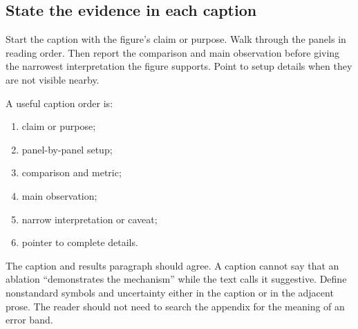 \subsection{State the evidence in each caption}

Start the caption with the figure's claim or purpose. Walk through the panels
in reading order. Then report the comparison and main observation before
giving the narrowest interpretation the figure supports. Point to setup
details when they are not visible nearby.

A useful caption order is:

\begin{enumerate}[leftmargin=*]
    \item claim or purpose;
    \item panel-by-panel setup;
    \item comparison and metric;
    \item main observation;
    \item narrow interpretation or caveat;
    \item pointer to complete details.
\end{enumerate}

The caption and results paragraph should agree. A caption cannot say that an
ablation ``demonstrates the mechanism'' while the text calls it suggestive.
Define nonstandard symbols and uncertainty either in the caption or in the
adjacent prose. The reader should not need to search the appendix for the
meaning of an error band.
